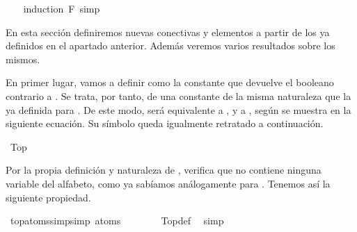 \begin{isabellebody}
%
\isadelimproof
\ \ %
\endisadelimproof
%
\isatagproof
{}\isamarkupfalse%
\ {\isacharparenleft}induction\ F{\isacharsemicolon}\ simp{\isacharparenright}%
\endisatagproof
{\isafoldproof}%
%
\isadelimproof
%
\endisadelimproof
%
\isadelimdocument
%
\endisadelimdocument
%
\isatagdocument
%
\isamarkuptrue%
%
\endisatagdocument
{\isafolddocument}%
%
\isadelimdocument
%
\endisadelimdocument
%
\begin{isamarkuptext}%
En esta sección definiremos nuevas conectivas y elementos a partir de los ya definidos en el
apartado anterior. Además veremos varios resultados sobre los mismos.%
\end{isamarkuptext}\isamarkuptrue%
%
\begin{isamarkuptext}%
En primer lugar, vamos a definir  como la constante  que devuelve
el booleano contrario a . Se trata, por tanto, de una constante de la misma naturaleza que
la ya definida para . De este modo,  será equivalente a , y  a ,
según se muestra en la siguiente ecuación. Su símbolo queda igualmente retratado a continuación.%
\end{isamarkuptext}\isamarkuptrue%
\isamarkupfalse%
\ Top\ {\isacharparenleft}{\isachardoublequoteopen}{\isasymtop}{\isachardoublequoteclose}{\isacharparenright}\ \isanewline
{\isachardoublequoteopen}{\isasymtop}\ {\isasymequiv}\ {\isasymbottom}\ \isactrlbold {\isasymrightarrow}\ {\isasymbottom}{\isachardoublequoteclose}%
\begin{isamarkuptext}%
Por la propia definición y naturaleza de , verifica que no contiene ninguna variable del
alfabeto, como ya sabíamos análogamente para . Tenemos así la siguiente propiedad.%
\end{isamarkuptext}\isamarkuptrue%
\isamarkupfalse%
\ top{\isacharunderscore}atoms{\isacharunderscore}simp{\isacharbrackleft}simp{\isacharbrackright}{\isacharcolon}\ {\isachardoublequoteopen}atoms\ {\isasymtop}\ {\isacharequal}\ {\isacharbraceleft}{\isacharbraceright}{\isachardoublequoteclose}\ \isanewline
%
\isadelimproof
\ \ %
\endisadelimproof
%
\isatagproof
{}\isamarkupfalse%
\ Top{\isacharunderscore}def\ \isamarkupfalse%
\ simp%
\endisatagproof
{\isafoldproof}%
%
\isadelimproof
%
\endisadelimproof
%
\begin{isamarkuptext}%

\end{isamarkuptext}
\end{isabellebody}
